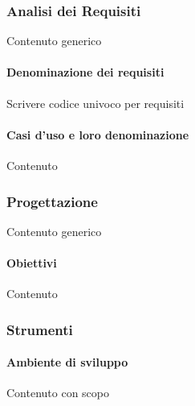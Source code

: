         \subsubsection{Analisi dei Requisiti}\label{PP:Sviluppo:AdR}
        Contenuto generico
        

	        \paragraph{Denominazione dei requisiti}\label{PP:Sviluppo:AdR:DenominazioneRequisiti}
	        Scrivere codice univoco per requisiti

	        \paragraph{Casi d'uso e loro denominazione}\label{PP:Sviluppo:AdR:CasiUso}
	        Contenuto
	        



        \subsubsection{Progettazione}\label{PP:Sviluppo:Progettazione}
        Contenuto generico
        

	        \paragraph{Obiettivi}\label{PP:Sviluppo:Progettazione:Obiettivi}
	        Contenuto



        
        \subsubsection{Strumenti}\label{PP:Sviluppo:Strumenti}
        
        	\paragraph{Ambiente di sviluppo}\label{PP:Sviluppo:Strumenti:AmbienteSviluppo}
        	Contenuto con scopo
        	
